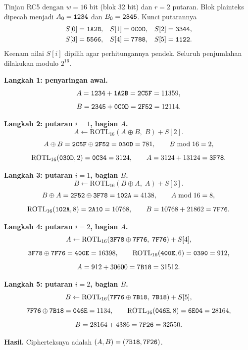 \begin{example}[Satu enkripsi RC5 dengan $w = 16$]
\label{ex:rc5-kecil}
Tinjau RC5 dengan $w = 16$ bit (blok 32 bit) dan $r = 2$ putaran. Blok plainteks
dipecah menjadi $A_0 = \texttt{1234}$ dan $B_0 = \texttt{2345}$. Kunci putarannya
\[
\begin{aligned}
S[0] &= \texttt{1A2B}, & S[1] &= \texttt{0C0D}, & S[2] &= \texttt{3344},\\
S[3] &= \texttt{5566}, & S[4] &= \texttt{7788}, & S[5] &= \texttt{1122}.
\end{aligned}
\]
Keenam nilai $S[i]$ dipilih agar perhitungannya pendek. Seluruh penjumlahan
dilakukan modulo $2^{16}$.

\textbf{Langkah 1: penyaringan awal.}
\[ A = \texttt{1234} + \texttt{1A2B} = \texttt{2C5F} = 11359, \]
\[ B = \texttt{2345} + \texttt{0C0D} = \texttt{2F52} = 12114. \]

\textbf{Langkah 2: putaran $i = 1$, bagian $A$.}
\[ A \leftarrow \mathrm{ROTL}_{16}(A \oplus B,\; B) + S[2]. \]
\[ A \oplus B = \texttt{2C5F} \oplus \texttt{2F52} = \texttt{030D} = 781,\qquad B \bmod 16 = 2, \]
\[ \mathrm{ROTL}_{16}(\texttt{030D}, 2) = \texttt{0C34} = 3124,\qquad A = 3124 + 13124 = \texttt{3F78}. \]

\textbf{Langkah 3: putaran $i = 1$, bagian $B$.}
\[ B \leftarrow \mathrm{ROTL}_{16}(B \oplus A,\; A) + S[3]. \]
\[ B \oplus A = \texttt{2F52} \oplus \texttt{3F78} = \texttt{102A} = 4138,\qquad A \bmod 16 = 8, \]
\[ \mathrm{ROTL}_{16}(\texttt{102A}, 8) = \texttt{2A10} = 10768,\qquad B = 10768 + 21862 = \texttt{7F76}. \]

\textbf{Langkah 4: putaran $i = 2$, bagian $A$.}
\[ A \leftarrow \mathrm{ROTL}_{16}(\texttt{3F78} \oplus \texttt{7F76},\; \texttt{7F76}) + S[4], \]
\[ \texttt{3F78} \oplus \texttt{7F76} = \texttt{400E} = 16398,\qquad \mathrm{ROTL}_{16}(\texttt{400E}, 6) = \texttt{0390} = 912, \]
\[ A = 912 + 30600 = \texttt{7B18} = 31512. \]

\textbf{Langkah 5: putaran $i = 2$, bagian $B$.}
\[ B \leftarrow \mathrm{ROTL}_{16}(\texttt{7F76} \oplus \texttt{7B18},\; \texttt{7B18}) + S[5], \]
\[ \texttt{7F76} \oplus \texttt{7B18} = \texttt{046E} = 1134,\qquad \mathrm{ROTL}_{16}(\texttt{046E}, 8) = \texttt{6E04} = 28164, \]
\[ B = 28164 + 4386 = \texttt{7F26} = 32550. \]

\textbf{Hasil.} Cipherteksnya adalah $(A,B) = (\texttt{7B18},\texttt{7F26})$.
\end{example}

